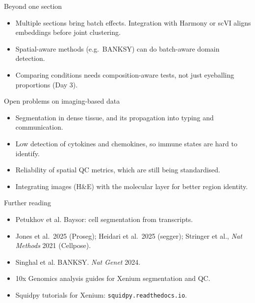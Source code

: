 \documentclass[aspectratio=169]{beamer}
\begin{document}
\begin{frame}{Beyond one section}
  \begin{itemize}
    \item Multiple sections bring batch effects. Integration with Harmony or scVI
      aligns embeddings before joint clustering.
    \item Spatial-aware methods (e.g.\ BANKSY) can do batch-aware domain detection.
    \item Comparing conditions needs composition-aware tests, not just eyeballing
      proportions (Day 3).
  \end{itemize}
\end{frame}

\begin{frame}{Open problems on imaging-based data}
  \begin{itemize}
    \item Segmentation in dense tissue, and its propagation into typing and
      communication.
    \item Low detection of cytokines and chemokines, so immune states are hard to
      identify.
    \item Reliability of spatial QC metrics, which are still being standardised.
    \item Integrating images (H\&E) with the molecular layer for better region
      identity.
  \end{itemize}
\end{frame}

\begin{frame}{Further reading}
  \footnotesize
  \begin{itemize}
    \item Petukhov et al. Baysor: cell segmentation from transcripts.
    \item Jones et al.\ 2025 (Proseg); Heidari et al.\ 2025 (segger); Stringer et al., \emph{Nat Methods} 2021 (Cellpose).
    \item Singhal et al. BANKSY. \emph{Nat Genet} 2024.
    \item 10x Genomics analysis guides for Xenium segmentation and QC.
    \item Squidpy tutorials for Xenium: \texttt{squidpy.readthedocs.io}.
  \end{itemize}
\end{frame}
\end{document}
